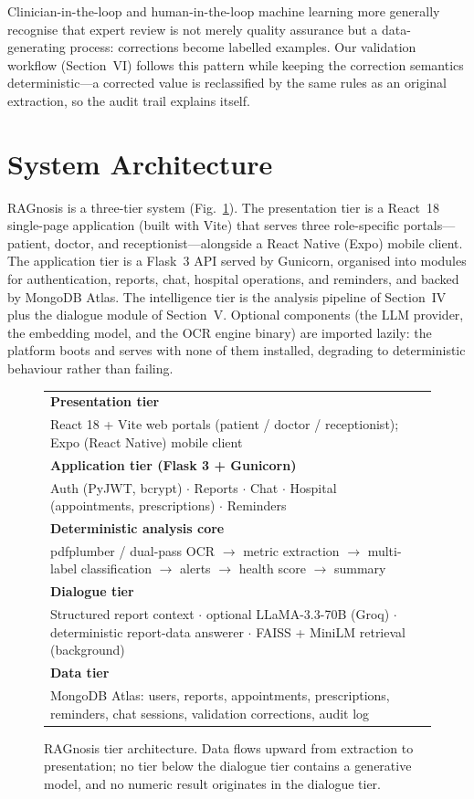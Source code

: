 \documentclass[conference]{IEEEtran}
\begin{document}
Clinician-in-the-loop and human-in-the-loop machine learning more
generally recognise that expert review is not merely quality assurance
but a data-generating process: corrections become labelled examples.
Our validation workflow (Section~VI) follows this pattern while keeping
the correction semantics deterministic---a corrected value is
reclassified by the same rules as an original extraction, so the audit
trail explains itself.

\section{System Architecture}
RAGnosis is a three-tier system (Fig.~\ref{fig:arch}). The presentation
tier is a React~18 single-page application (built with Vite) that serves
three role-specific portals---patient, doctor, and
receptionist---alongside a React Native (Expo) mobile client. The
application tier is a Flask~3 API served by Gunicorn, organised into
modules for authentication, reports, chat, hospital operations, and
reminders, and backed by MongoDB Atlas. The intelligence tier is the
analysis pipeline of Section~IV plus the dialogue module of
Section~V. Optional components (the LLM provider, the embedding model,
and the OCR engine binary) are imported lazily: the platform boots and
serves with none of them installed, degrading to deterministic
behaviour rather than failing.

\begin{figure}[t]
\centering
\small
\begin{tabular}{|p{}|}
\hline
\textbf{Presentation tier} \\
React 18 + Vite web portals (patient / doctor / receptionist);
Expo (React Native) mobile client \\
\hline
\textbf{Application tier (Flask 3 + Gunicorn)} \\
Auth (PyJWT, bcrypt) $\cdot$ Reports $\cdot$ Chat $\cdot$ Hospital
(appointments, prescriptions) $\cdot$ Reminders \\
\hline
\textbf{Deterministic analysis core} \\
pdfplumber / dual-pass OCR $\rightarrow$ metric extraction $\rightarrow$
multi-label classification $\rightarrow$ alerts $\rightarrow$ health
score $\rightarrow$ summary \\
\hline
\textbf{Dialogue tier} \\
Structured report context $\cdot$ optional LLaMA-3.3-70B (Groq)
$\cdot$ deterministic report-data answerer $\cdot$ FAISS + MiniLM
retrieval (background) \\
\hline
\textbf{Data tier} \\
MongoDB Atlas: users, reports, appointments, prescriptions,
reminders, chat sessions, validation corrections, audit log \\
\hline
\end{tabular}
\caption{RAGnosis tier architecture. Data flows upward from extraction
to presentation; no tier below the dialogue tier contains a generative
model, and no numeric result originates in the dialogue tier.}
\label{fig:arch}
\end{figure}
\end{document}
